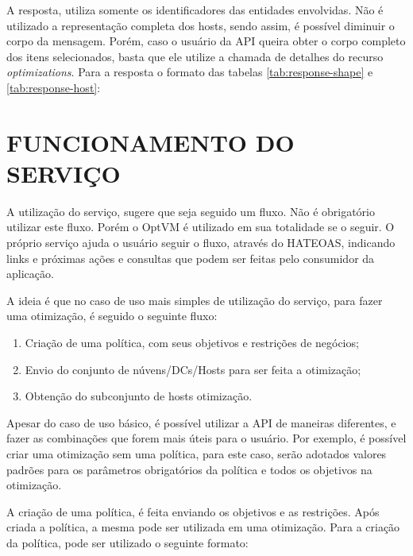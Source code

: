





A resposta, utiliza somente os identificadores das entidades envolvidas. Não
é utilizado a representação completa dos hosts, sendo assim, é possível
diminuir o corpo da mensagem. Porém, caso o usuário da API queira obter 
o corpo completo dos itens selecionados, basta que ele utilize a chamada de 
detalhes do recurso \textit{optimizations}. Para a resposta o formato das
tabelas \ref{tab:response-shape} e \ref{tab:response-host}:




\section{FUNCIONAMENTO DO SERVIÇO}

A utilização do serviço, sugere que seja seguido um fluxo. Não é obrigatório
utilizar este fluxo. Porém o OptVM é utilizado em sua totalidade se o seguir. 
O próprio serviço ajuda o usuário seguir o fluxo, através do HATEOAS, indicando 
links e próximas ações e consultas que podem ser feitas pelo consumidor da aplicação.

A ideia é que no caso de uso mais simples de utilização do serviço, 
para fazer uma otimização, é seguido o seguinte fluxo:

\begin{enumerate}
 \item Criação de uma política, com seus objetivos e restrições de negócios;
 \item Envio do conjunto de núvens/DCs/Hosts para ser feita a otimização;
 \item Obtenção do subconjunto de hosts otimização.
\end{enumerate}



Apesar do caso de uso básico, é possível utilizar a API de maneiras diferentes,
e fazer as combinações que forem mais úteis para o usuário. Por exemplo, é possível
criar uma otimização sem uma política, para este caso, serão adotados valores
padrões para os parâmetros obrigatórios da política e todos os objetivos na otimização.

A criação de uma política, é feita enviando os objetivos e as restrições.
Após criada a política, a mesma pode ser utilizada em uma otimização. Para a 
criação da política, pode ser utilizado o seguinte formato:

